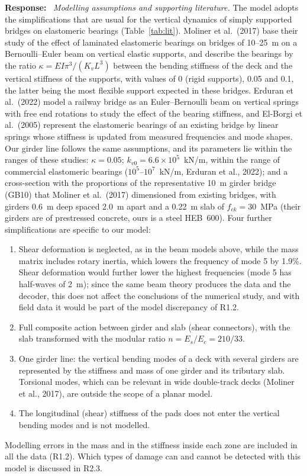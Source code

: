 \documentclass[11pt]{article}
\newenvironment{response}{\par\smallskip\noindent\color{resp}\textbf{Response:}\ }{\par}
\begin{document}
\begin{response}
\textit{Modelling assumptions and supporting literature.} The model adopts the simplifications that are usual for the
vertical dynamics of simply supported bridges on elastomeric bearings (Table~\ref{tab:lit}). Moliner et al.\ (2017) base
their study of the effect of laminated elastomeric bearings on bridges of 10--25~m on a Bernoulli--Euler beam on
vertical elastic supports, and
describe the bearings by the ratio $\kappa=EI\pi^3/(K_vL^3)$ between the bending stiffness of the deck and the vertical
stiffness of the supports, with values of 0 (rigid supports), 0.05 and 0.1, the latter being the most flexible support
expected in these bridges. Erduran et al.\ (2022) model a railway bridge as an Euler--Bernoulli beam on vertical springs
with free end rotations to study the effect of the bearing stiffness, and El-Borgi et al.\ (2005) represent the
elastomeric bearings of an existing bridge by linear springs whose stiffness is updated from measured frequencies and
mode shapes. Our girder line follows the same assumptions, and its parameters lie within the ranges of these studies:
$\kappa=0.05$; $k_{v0}=6.6\times10^{5}$~kN/m, within the range of commercial elastomeric bearings
($10^{5}$--$10^{7}$~kN/m, Erduran et al., 2022); and a cross-section with the proportions of the representative 10~m
girder bridge (GB10) that Moliner et al.\ (2017) dimensioned from existing bridges, with girders 0.6~m deep spaced
2.0~m apart and a 0.22~m slab of $f_{ck}=30$~MPa (their girders are of prestressed concrete, ours is a steel HEB~600).
Four further simplifications are specific to our model:
\begin{enumerate}[label=(\roman*),leftmargin=*]
\item Shear deformation is neglected, as in the beam models above, while the mass matrix includes rotary inertia, which
lowers the frequency of mode 5 by 1.9\%. Shear deformation would further lower the highest frequencies (mode 5 has
half-waves of 2~m); since the same beam theory produces the data and the decoder, this does not affect the conclusions of
the numerical study, and with field data it would be part of the model discrepancy of R1.2.
\item Full composite action between girder and slab (shear connectors), with the slab transformed with the modular
ratio $n=E_s/E_c=210/33$.
\item One girder line: the vertical bending modes of a deck with several girders are represented by the stiffness and
mass of one girder and its tributary slab. Torsional modes, which can be relevant in wide double-track decks (Moliner
et al., 2017), are outside the scope of a planar model.
\item The longitudinal (shear) stiffness of the pads does not enter the vertical bending modes and is not modelled.
\end{enumerate}
Modelling errors in the mass and in the stiffness inside each zone are included in all the data (R1.2). Which types of
damage can and cannot be detected with this model is discussed in R2.3.


\end{response}
\end{document}
